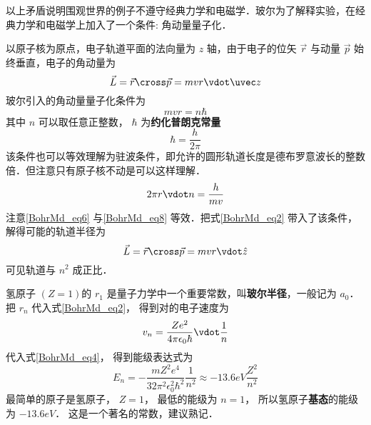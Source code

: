 以上矛盾说明围观世界的例子不遵守经典力学和电磁学．玻尔为了解释实验，在经典力学和电磁学上加入了一个条件: 角动量量子化．

以原子核为原点，电子轨道平面的法向量为 $z$ 轴，由于电子的位矢 $\vec r$ 与动量 $\vec p$ 始终垂直，电子的角动量为
\begin{equation}
\vec L = \vec r \cross \vec p = mvr \vdot \uvec z
\end{equation}
玻尔引入的角动量量子化条件为
\begin{equation}\label{BohrMd_eq6}
mvr = n\hbar 
\end{equation}
其中 $n$ 可以取任意正整数， $\hbar$ 为\textbf{约化普朗克常量}
\begin{equation}\label{BohrMd_eq7}
\hbar  = \frac{h}{{2\pi }}
\end{equation}
该条件也可以等效理解为驻波条件，即允许的圆形轨道长度是德布罗意波长的整数倍．但注意只有原子核不动是可以这样理解．
\begin{equation}\label{BohrMd_eq8}
2\pi r \vdot n = \frac{h}{{mv}}
\end{equation}
注意\autoref{BohrMd_eq6} 与\autoref{BohrMd_eq8} 等效．把式\autoref{BohrMd_eq2} 带入了该条件，解得可能的轨道半径为
\begin{equation}\label{BohrMd_eq9}
\vec L = \vec r \cross \vec p = mvr \vdot \hat z
\end{equation}
可见轨道与 $n^2$ 成正比．

氢原子 $(Z=1)$的 $r_1$ 是量子力学中一个重要常数，叫\textbf{玻尔半径}，一般记为 $a_0$． 把 $r_n$ 代入式\autoref{BohrMd_eq2}， 得到对的电子速度为
\begin{equation}\label{BohrMd_eq10}
{v_n} = \frac{{Z{e^2}}}{{4\pi {\epsilon _0}\hbar }} \vdot \frac{1}{n}
\end{equation}
代入式\autoref{BohrMd_eq4}， 得到能级表达式为
\begin{equation}\label{BohrMd_eq11}
{E_n} =  - \frac{{m{Z^2}{e^4}}}{{32{\pi ^2}\epsilon _0^2{\hbar ^2}}}\frac{1}{{{n^2}}} \approx  - 13.6eV\frac{{{Z^2}}}{{{n^2}}}
\end{equation}
最简单的原子是氢原子， $Z = 1$， 最低的能级为 $n = 1$， 所以氢原子\textbf{基态}的能级为 $-13.6eV$． 这是一个著名的常数，建议熟记．









